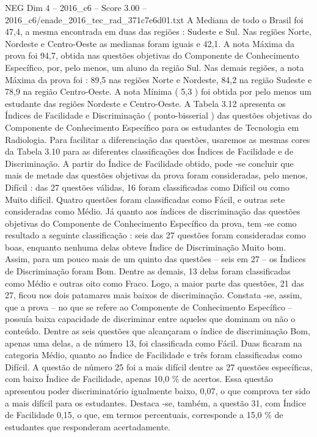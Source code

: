 \begin{textsample}{NEG Dim 4 – 2016\_c6 – Score 3.00 – 2016\_c6/enade\_2016\_tec\_rad\_371c7e6d01.txt}
A Mediana de todo o Brasil foi 47,4, a mesma encontrada em duas das regiões : Sudeste e Sul.
Nas regiões Norte, Nordeste e Centro-Oeste as medianas foram iguais e 42,1.
A nota Máxima da prova foi 94,7, obtida nas questões objetivas do Componente de Conhecimento Específico, por, pelo menos, um aluno da região Sul.
Nas demais regiões, a nota Máxima da prova foi : 89,5 nas regiões Norte e Nordeste, 84,2 na região Sudeste e 78,9 na região Centro-Oeste.
A nota Mínima ( 5,3 ) foi obtida por pelo menos um estudante das regiões Nordeste e Centro-Oeste.
A Tabela 3.12 apresenta os Índices de Facilidade e Discriminação ( ponto-bisserial ) das questões objetivas do Componente de Conhecimento Específico para os estudantes de Tecnologia em Radiologia.
Para facilitar a diferenciação das questões, usaremos as mesmas cores da Tabela 3.10 para as diferentes classificações dos Índices de Facilidade e de Discriminação.
A partir do Índice de Facilidade obtido, pode -se concluir que mais de metade das questões objetivas da prova foram consideradas, pelo menos, Difícil : das 27 questões válidas, 16 foram classificadas como Difícil ou como Muito difícil.
Quatro questões foram classificadas como Fácil, e outras sete consideradas como Médio.
Já quanto aos índices de discriminação das questões objetivas do Componente de Conhecimento Específico da prova, tem -se como resultado a seguinte classificação : seis das 27 questões foram consideradas como boas, enquanto nenhuma delas obteve Índice de Discriminação Muito bom.
Assim, para um pouco mais de um quinto das questões – seis em 27 – os Índices de Discriminação foram Bom.
Dentre as demais, 13 delas foram classificadas como Médio e outras oito como Fraco.
Logo, a maior parte das questões, 21 das 27, ficou nos dois patamares mais baixos de discriminação.
Constata -se, assim, que a prova – no que se refere ao Componente de Conhecimento Específico – possuía baixa capacidade de discriminar entre aqueles que dominam ou não o conteúdo.
Dentre as seis questões que alcançaram o índice de discriminação Bom, apenas uma delas, a de número 13, foi classificada como Fácil.
Duas ficaram na categoria Médio, quanto ao Índice de Facilidade e três foram classificadas como Difícil.
A questão de número 25 foi a mais difícil dentre as 27 questões específicas, com baixo Índice de Facilidade, apenas 10,0 \% de acertos.
Essa questão apresentou poder discriminatório igualmente baixo, 0,07, o que comprova ter sido a mais difícil para os estudantes.
Destaca -se, também, a questão 31, com Índice de Facilidade 0,15, o que, em termos percentuais, corresponde a 15,0 \% de estudantes que responderam acertadamente.

\end{textsample}
